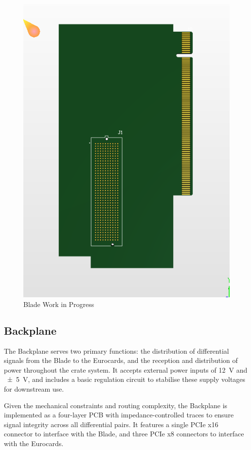 \documentclass[a4paper,11pt]{article}
\begin{document}
\begin{figure}[htbp]
\centering
\includegraphics[scale=0.5]{G2BladeWIP.png}
\caption{Blade Work in Progress\label{fig:BladeWIP}}
\end{figure}

\subsection{Backplane}\label{backplane}

The Backplane serves two primary functions: the distribution of differential signals from the Blade to the Eurocards, and the reception and distribution of power throughout the crate system. It accepts external power inputs of \SI{12}{\volt} and \SI{\pm5}{\volt}, and includes a basic regulation circuit to stabilise these supply voltages for downstream use.

Given the mechanical constraints and routing complexity, the Backplane is implemented as a four-layer PCB with impedance-controlled traces to ensure signal integrity across all differential pairs. It features a single PCIe x16 connector to interface with the Blade, and three PCIe x8 connectors to interface with the Eurocards.
\end{document}
